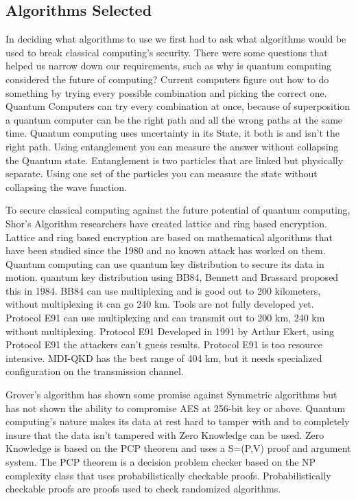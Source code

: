 \documentclass[sigconf]{acmart}
\begin{document}
\subsection{Algorithms Selected}
In deciding what algorithms to use we first had to ask what algorithms would be used to break classical computing’s security. There were some questions that helped us narrow down our requirements, such as why is quantum computing considered the future of computing?  Current computers figure out how to do something by trying every possible combination and picking the correct one. Quantum Computers can try every combination at once, because of superposition a quantum computer can be the right path and all the wrong paths at the same time. Quantum computing uses uncertainty in its State, it both is and isn’t the right path. Using entanglement you can measure the answer without collapsing the Quantum state. Entanglement is two particles that are linked but physically separate. Using one set of the particles you can measure the state without collapsing the wave function.

To secure classical computing against the future potential of quantum computing, Shor’s Algorithm researchers have created lattice and ring based encryption. Lattice and ring based encryption are based on mathematical algorithms that have been studied since the 1980 and no known attack has worked on them. Quantum computing can use quantum key distribution to secure its data in motion. quantum key distribution using BB84, Bennett and Brassard proposed this in 1984. BB84 can use multiplexing and is good out to 200 kilometers, without multiplexing it can go 240 km. Tools are not fully developed yet. Protocol E91 can use multiplexing and can transmit out to 200 km, 240 km without multiplexing. Protocol E91 Developed in 1991 by Arthur Ekert, using Protocol E91 the attackers can’t guess results. Protocol E91 is too resource intensive. MDI-QKD has the best range of 404 km, but it needs specialized configuration on the transmission channel. 

Grover’s algorithm has shown some promise against Symmetric algorithms but has not shown the ability to compromise AES at 256-bit key or above. Quantum computing’s nature makes its data at rest hard to tamper with and to completely insure that the data isn’t tampered with Zero Knowledge can be used. Zero Knowledge is based on the PCP theorem and uses a S=(P,V) proof and argument system. The PCP theorem is a decision problem checker based on the NP complexity class that uses probabilistically checkable proofs. Probabilistically checkable proofs are proofs used to check randomized algorithms. 
\end{document}
